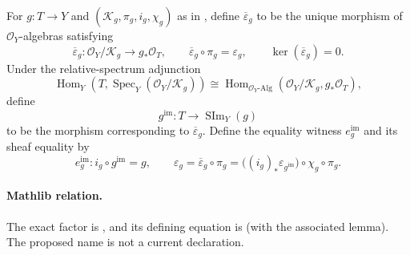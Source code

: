 \begin{definition}
  \label{def:nagata-scheme-image-factor}

  For $g\colon T\to Y$ and
  $(\mathcal K_g,\pi_g,i_g,\chi_g)$ as in
  , define
  $\overline\varepsilon_g$ to be the unique morphism of
  $\mathcal O_Y$-algebras satisfying
  \[
    \overline\varepsilon_g\colon
      \mathcal O_Y/\mathcal K_g\longrightarrow g_*\mathcal O_T,
    \qquad
    \overline\varepsilon_g\circ\pi_g=\varepsilon_g,
    \qquad
    \ker(\overline\varepsilon_g)=0.
  \]
  Under the relative-spectrum adjunction
  \[
    \operatorname{Hom}_Y
      \!\left(T,\operatorname{Spec}_Y(\mathcal O_Y/\mathcal K_g)\right)
      \cong
    \operatorname{Hom}_{\mathcal O_Y\text{-Alg}}
      \!\left(\mathcal O_Y/\mathcal K_g,g_*\mathcal O_T\right),
  \]
  define
  \[
    g^{\mathrm{im}}\colon T\longrightarrow\operatorname{SIm}_Y(g)
  \]
  to be the morphism corresponding to $\overline\varepsilon_g$.  Define the
  equality witness $e_g^{\mathrm{im}}$ and its sheaf equality by
  \[
    e_g^{\mathrm{im}}\colon i_g\circ g^{\mathrm{im}}=g,
    \qquad
    \varepsilon_g
      =\overline\varepsilon_g\circ\pi_g
      =\bigl((i_g)_*\varepsilon_{g^{\mathrm{im}}}\bigr)
         \circ\chi_g\circ\pi_g.
  \]

  \paragraph{Mathlib relation.}
  The exact factor is \texttt{}, and its
  defining equation is
  \texttt{} (with the associated
  \texttt{} lemma).  The proposed name
  \texttt{} is not a current declaration.
\end{definition}

